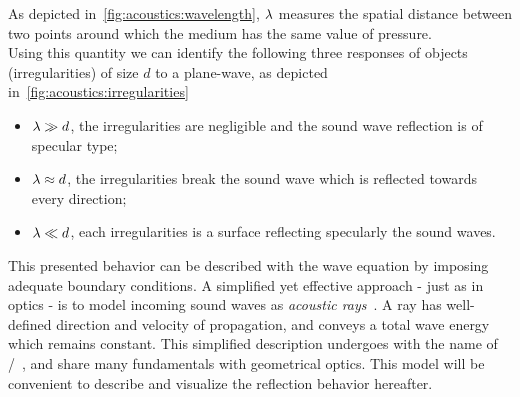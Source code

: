 As depicted in~\cref{fig:acoustics:wavelength}, $\lambda$ measures the spatial distance between two points around which the medium has the same value of pressure.
\\Using this quantity we can identify the following three responses of objects (irregularities) of size $d$ to a plane-wave, as depicted in~\cref{fig:acoustics:irregularities}

\begin{figure}[h]
    \footnotesize
    \resizebox{\linewidth}{!}{
        
    }
    \vspace{-\baselineskip}\vspace{-\baselineskip}
\end{figure}


\begin{itemize}
    \item $\lambda \gg d$, the irregularities are negligible and the sound wave reflection is of specular type;
    \item $\lambda \approx d$, the irregularities break the sound wave which is reflected towards every direction;
    \item $\lambda \ll d$, each irregularities is a surface reflecting specularly the sound waves.
\end{itemize}

\mynewline
This presented behavior can be described with the wave equation by imposing adequate boundary conditions.
A simplified yet effective approach - just as in optics - is to model incoming sound waves as \textit{acoustic rays}~.
A ray has well-defined direction and velocity of propagation, and conveys a total wave energy which remains constant.
This simplified description undergoes with the name of \GAdef/~, and share many fundamentals with geometrical optics.
This model will be convenient to describe and visualize the reflection behavior hereafter.

